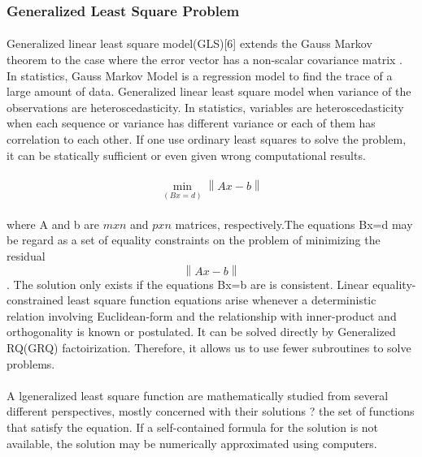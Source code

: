 \documentclass[pdftex,12pt,a4paper]{article}
\begin{document}
\subsubsection{Generalized Least Square Problem}
\paragraph{}
Generalized linear least square model(GLS)[6] extends the Gauss Markov theorem to the case where the error vector has a non-scalar covariance matrix . In statistics, Gauss Markov Model is a regression model to find the trace of a large amount of data. Generalized linear least square model when variance of the observations are heteroscedasticity. In statistics, variables are heteroscedasticity when  each sequence or variance has different variance or each of them has correlation to each other. If one use ordinary least squares to solve the problem, it can be statically sufficient or even given wrong computational results. 

\paragraph{}
\begin{equation}
\min_{(Bx=d)}\left \| Ax-b \right \|
\end{equation}
\paragraph{}
where A and b are $m x n$ and $p x n$ matrices, respectively.The equations Bx=d may be regard as a set of equality constraints on the problem of minimizing the residual\begin{equation}\left \| Ax-b \right \|\end{equation}. The solution only exists if the equations Bx=b are is consistent. Linear equality-constrained least square function equations arise whenever a deterministic relation involving Euclidean-form and the relationship with inner-product and orthogonality is known or postulated. It can be solved directly by Generalized RQ(GRQ) factoirization. Therefore, it allows us to use fewer subroutines to solve problems. 
\paragraph{}
A lgeneralized least square function are mathematically studied from several different perspectives, mostly concerned with their solutions ? the set of functions that satisfy the equation. If a self-contained formula for the solution is not available, the solution may be numerically approximated using computers. 
\end{document}
